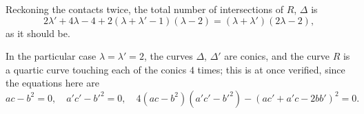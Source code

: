 \documentclass[11pt,a4paper]{article}
\begin{document}
\medskip

Reckoning the contacts twice, the total number of intersections of $R$, $\Delta$ is
\[
2\lambda' + 4\lambda - 4 + 2(\lambda + \lambda' - 1)(\lambda - 2) = (\lambda + \lambda')(2\lambda - 2),
\]
as it should be.

\medskip

In the particular case $\lambda = \lambda' = 2$, the curves $\Delta$, $\Delta'$ are conics, and the curve $R$ is a quartic curve touching each of the conics $4$ times; this is at once verified, since the equations here are
\[
ac - b^{2} = 0, \quad a'c' - b'^{2} = 0, \quad 4(ac - b^{2})(a'c' - b'^{2}) - (ac' + a'c - 2bb')^{2} = 0.
\]
\end{document}
